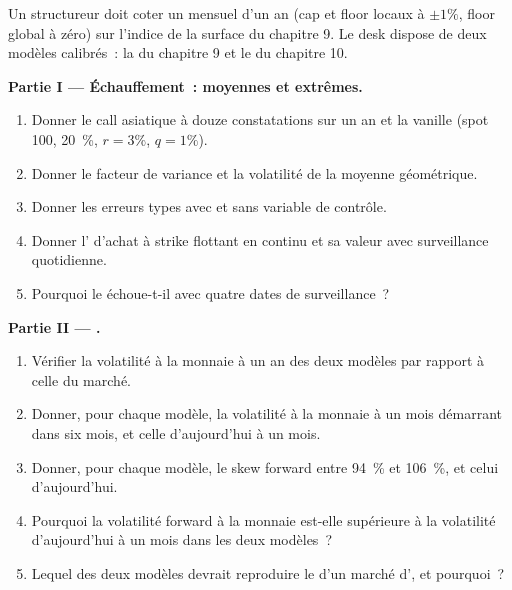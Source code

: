 \begin{problem}\label{pb:dv:asians-lookbacks-cliquets-and-forward-starts:1}
Un structureur doit coter un  mensuel d'un an (cap et floor locaux à $\pm1\%$, floor global à zéro) sur l'indice de
la surface du chapitre 9. Le desk dispose de deux modèles calibrés~: la  du chapitre 9 et le  du chapitre 10.

\medskip\noindent\textbf{Partie I --- Échauffement~: moyennes et extrêmes.}
\begin{enumerate}
\item Donner le call asiatique à douze constatations sur un an et la vanille (spot 100, 20~\%, $r=3\%$, $q=1\%$).
\item Donner le facteur de variance et la volatilité de la moyenne géométrique.
\item Donner les erreurs types avec et sans variable de contrôle.
\item Donner l' d'achat à strike flottant en continu et sa valeur avec surveillance quotidienne.
\item Pourquoi le  échoue-t-il avec quatre dates de surveillance~?
\end{enumerate}

\medskip\noindent\textbf{Partie II --- .}
\begin{enumerate}[resume]
\item Vérifier la volatilité à la monnaie à un an des deux modèles par rapport à celle du marché.
\item Donner, pour chaque modèle, la volatilité à la monnaie à un mois démarrant dans six mois, et celle d'aujourd'hui à un mois.
\item Donner, pour chaque modèle, le skew forward entre 94~\% et 106~\%, et celui d'aujourd'hui.
\item Pourquoi la volatilité forward à la monnaie est-elle supérieure à la volatilité d'aujourd'hui à un mois dans les deux modèles~?
\item Lequel des deux modèles devrait reproduire le  d'un marché d', et pourquoi~?
\end{enumerate}


\end{problem}
